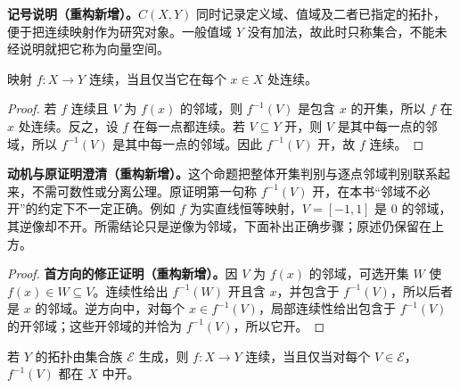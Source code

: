\documentclass[../../main.tex]{subfiles}%
\begin{document}
\begin{remark}
\textbf{记号说明（重构新增）。}$C(X,Y)$ 同时记录定义域、值域及二者已指定的拓扑，便于把连续映射作为研究对象。一般值域 $Y$ 没有加法，故此时只称集合，不能未经说明就把它称为向量空间。
\end{remark}
\begin{proposition}\label{proposition:ch04-continuous-iff-pointwise}
映射 $f:X\to Y$ 连续，当且仅当它在每个 $x\in X$ 处连续。
\end{proposition}
\begin{proof}
若 $f$ 连续且 $V$ 为 $f(x)$ 的邻域，则 $f^{-1}(V)$ 是包含 $x$ 的开集，所以 $f$ 在 $x$ 处连续。反之，设 $f$ 在每一点都连续。若 $V\subseteq Y$ 开，则 $V$ 是其中每一点的邻域，所以 $f^{-1}(V)$ 是其中每一点的邻域。因此 $f^{-1}(V)$ 开，故 $f$ 连续。
\end{proof}
\begin{remark}
\textbf{动机与原证明澄清（重构新增）。}这个命题把整体开集判别与逐点邻域判别联系起来，不需可数性或分离公理。原证明第一句称 $f^{-1}(V)$ 开，在本书“邻域不必开”的约定下不一定正确。例如 $f$ 为实直线恒等映射，$V=[-1,1]$ 是 $0$ 的邻域，其逆像却不开。所需结论只是逆像为邻域，下面补出正确步骤；原述仍保留在上方。
\end{remark}
\begin{proof}
\textbf{首方向的修正证明（重构新增）。}因 $V$ 为 $f(x)$ 的邻域，可选开集 $W$ 使 $f(x)\in W\subseteq V$。连续性给出 $f^{-1}(W)$ 开且含 $x$，并包含于 $f^{-1}(V)$，所以后者是 $x$ 的邻域。逆方向中，对每个 $x\in f^{-1}(V)$，局部连续性给出包含于 $f^{-1}(V)$ 的开邻域；这些开邻域的并恰为 $f^{-1}(V)$，所以它开。
\end{proof}
\begin{proposition}\label{proposition:ch04-continuity-subbase}
若 $Y$ 的拓扑由集合族 $\mathcal E$ 生成，则 $f:X\to Y$ 连续，当且仅当对每个 $V\in\mathcal E$，$f^{-1}(V)$ 都在 $X$ 中开。
\end{proposition}
\end{document}
